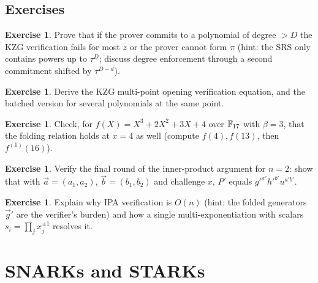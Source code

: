 \documentclass[11pt,a4paper]{report}
\theoremstyle{plain}
\theoremstyle{definition}
\newtheorem{exercise}[theorem]{Exercise}
\theoremstyle{remark}
\begin{document}
\section*{Exercises}
\begin{exercise}
Prove that if the prover commits to a polynomial of degree $>D$ the KZG verification fails for most $z$ or the prover cannot form $\pi$ (hint: the SRS only contains powers up to $\tau^D$; discuss degree enforcement through a second commitment shifted by $\tau^{D-d}$).
\end{exercise}
\begin{exercise}
Derive the KZG multi-point opening verification equation, and the batched version for several polynomials at the same point.
\end{exercise}
\begin{exercise}\label{ex:foldcheck}
Check, for $f(X)=X^3+2X^2+3X+4$ over $\mathbb{F}_{17}$ with $\beta=3$, that the folding relation holds at $x=4$ as well (compute $f(4),f(13)$, then $f^{(1)}(16)$).
\end{exercise}
\begin{exercise}
Verify the final round of the inner-product argument for $n=2$: show that with $\vec a=(a_1,a_2)$, $\vec b=(b_1,b_2)$ and challenge $x$, $P'$ equals $g'^{a'}h'^{b'}u^{a'b'}$.
\end{exercise}
\begin{exercise}
Explain why IPA verification is $O(n)$ (hint: the folded generators $\vec g'$ are the verifier's burden) and how a single multi-exponentiation with scalars $s_i=\prod_jx_j^{\pm1}$ resolves it.
\end{exercise}

\chapter{SNARKs and STARKs}
\label{ch:snark}
\end{document}
